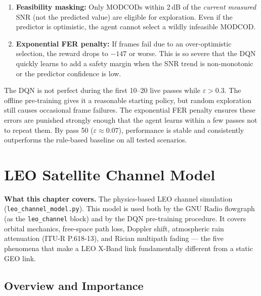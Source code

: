 \documentclass[12pt,a4paper]{report}
\begin{document}
\begin{enumerate}
  \item \textbf{Feasibility masking:} Only MODCODs within 2\,dB of the
        \emph{current measured} SNR (not the predicted value) are eligible
        for exploration.  Even if the predictor is optimistic, the agent
        cannot select a wildly infeasible MODCOD.
  \item \textbf{Exponential FER penalty:} If frames fail due to an
        over-optimistic selection, the reward drops to $-147$ or worse.
        This is so severe that the DQN quickly learns to add a safety margin
        when the SNR trend is non-monotonic or the predictor confidence is
        low.
\end{enumerate}

\begin{importantnote}
The DQN is not perfect during the first 10--20 live passes while
$\varepsilon > 0.3$.  The offline pre-training gives it a reasonable
starting policy, but random exploration still causes occasional frame
failures.  The exponential FER penalty ensures these errors are punished
strongly enough that the agent learns within a few passes not to repeat
them.  By pass 50 ($\varepsilon \approx 0.07$), performance is stable
and consistently outperforms the rule-based baseline on all tested scenarios.
\end{importantnote}

\chapter{LEO Satellite Channel Model}
\label{chap:channel}

\begin{keyinsight}
\textbf{What this chapter covers.}
The physics-based LEO channel simulation (\texttt{leo\_channel\_model.py}).
This model is used both by the GNU Radio flowgraph (as the \texttt{leo\_channel}
block) and by the DQN pre-training procedure.  It covers orbital mechanics, free-space
path loss, Doppler shift, atmospheric rain attenuation (ITU-R P.618-13), and
Rician multipath fading --- the five phenomena that make a LEO X-Band link
fundamentally different from a static GEO link.
\end{keyinsight}

\section{Overview and Importance}
\end{document}
